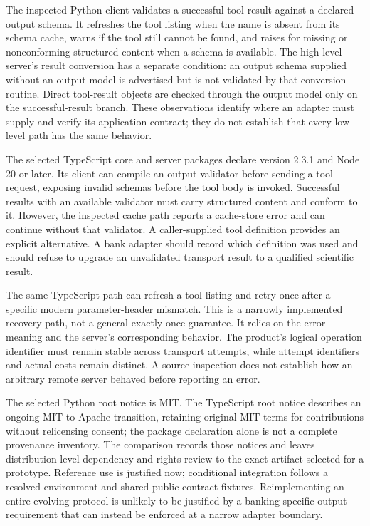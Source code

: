 The inspected Python client validates a successful tool result against a
declared output schema. It refreshes the tool listing when the name is absent
from its schema cache, warns if the tool still cannot be found, and raises
for missing or nonconforming structured content when a schema is available.
The high-level server's result conversion has a separate condition: an output
schema supplied without an output model is advertised but is not validated
by that conversion routine. Direct tool-result objects are checked through
the output model only on the successful-result branch. These observations
identify where an adapter must supply and verify its application contract;
they do not establish that every low-level path has the same behavior.
\citep{exec24_mcp_python}

The selected TypeScript core and server packages declare version 2.3.1 and
Node 20 or later. Its client can compile an output validator before sending a
tool request, exposing invalid schemas before the tool body is invoked.
Successful results with an available validator must carry structured content
and conform to it. However, the inspected cache path reports a cache-store
error and can continue without that validator. A caller-supplied tool
definition provides an explicit alternative. A bank adapter should record
which definition was used and should refuse to upgrade an unvalidated
transport result to a qualified scientific result.~\citep{exec24_mcp_typescript}

The same TypeScript path can refresh a tool listing and retry once after a
specific modern parameter-header mismatch. This is a narrowly implemented
recovery path, not a general exactly-once guarantee. It relies on the error
meaning and the server's corresponding behavior. The product's logical
operation identifier must remain stable across transport attempts, while
attempt identifiers and actual costs remain distinct. A source inspection
does not establish how an arbitrary remote server behaved before reporting
an error.~\citep{exec24_mcp_typescript,exec24_mcp_contracts}

The selected Python root notice is MIT. The TypeScript root notice describes
an ongoing MIT-to-Apache transition, retaining original MIT terms for
contributions without relicensing consent; the package declaration alone is
not a complete provenance inventory. The comparison records those notices
and leaves distribution-level dependency and rights review to the exact
artifact selected for a prototype. Reference use is justified now;
conditional integration follows a resolved environment and shared public
contract fixtures. Reimplementing an entire evolving protocol is unlikely
to be justified by a banking-specific output requirement that can instead
be enforced at a narrow adapter boundary.~\citep{exec24_mcp_python,
exec24_mcp_typescript,exec24_mcp_contracts}

